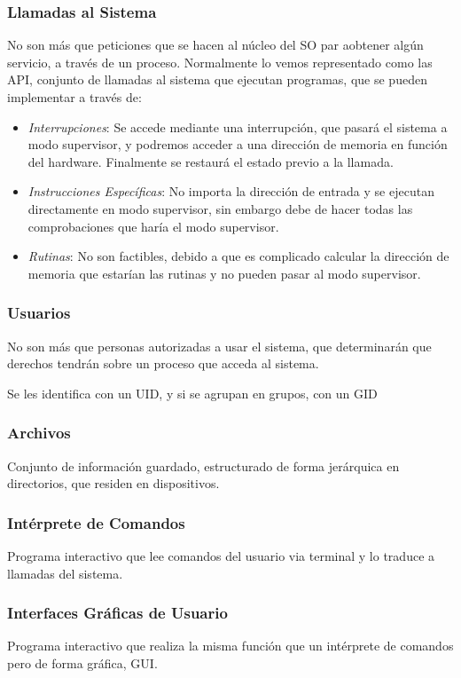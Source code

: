 \subsubsection{Llamadas al Sistema}
No son más que peticiones que se hacen al núcleo del SO par aobtener algún servicio, a través de un proceso. Normalmente lo vemos representado como las API, conjunto de llamadas al sistema que ejecutan programas, que se pueden implementar a través de:
\begin{itemize}
        \item \textit{Interrupciones}: Se accede mediante una interrupción, que pasará el sistema a modo supervisor, y podremos acceder a una dirección de memoria en función del hardware. Finalmente se restaurá el estado previo a la llamada.
        \item \textit{Instrucciones Específicas}: No importa la dirección de entrada y se ejecutan directamente en modo supervisor, sin embargo debe de hacer todas las comprobaciones que haría el modo supervisor.
        \item \textit{Rutinas}: No son factibles, debido a que es complicado calcular la dirección de memoria que estarían las rutinas y no pueden pasar al modo supervisor.
\end{itemize}
\subsubsection{Usuarios}
No son más que personas autorizadas a usar el sistema, que determinarán que derechos tendrán sobre un proceso que acceda al sistema.\par  Se les identifica con un UID, y si se agrupan en grupos, con un GID
\subsubsection{Archivos}
Conjunto de información guardado, estructurado de forma jerárquica en directorios, que residen en dispositivos.
\subsubsection{Intérprete de Comandos}
Programa interactivo que lee comandos del usuario via terminal y lo traduce a llamadas del sistema.
\subsubsection{Interfaces Gráficas de Usuario}
Programa interactivo que realiza la misma función que un intérprete de comandos pero de forma gráfica, GUI.
